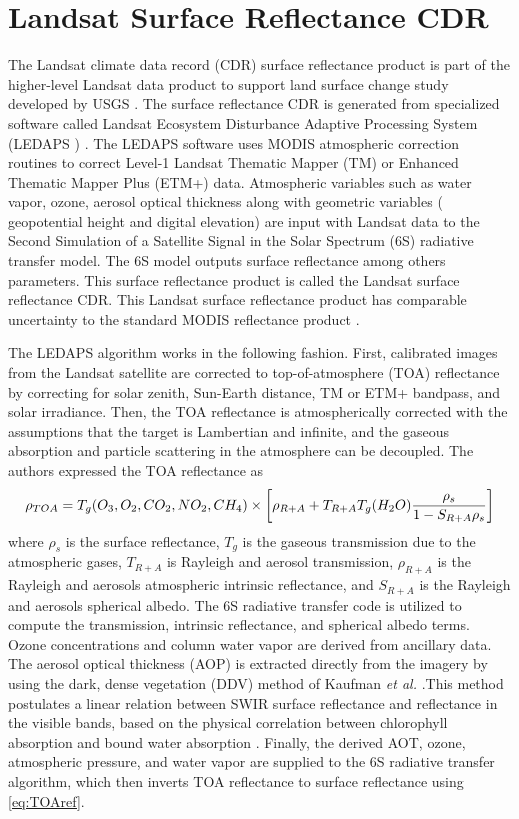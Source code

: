 \section{Landsat Surface Reflectance CDR}
\label{sec:CDR} 
The Landsat climate data record (CDR) surface reflectance product is part of the higher-level Landsat data product to support land surface change study developed by USGS \cite{LandsatCDR}. The surface reflectance CDR is generated from specialized software called Landsat Ecosystem Disturbance Adaptive Processing System (LEDAPS  ) \cite{Masek:2006}. The LEDAPS software uses MODIS atmospheric correction routines to correct Level-1 Landsat Thematic Mapper (TM) or Enhanced Thematic Mapper Plus (ETM+) data. Atmospheric variables such as water vapor, ozone, aerosol optical thickness along with geometric variables ({ geopotential height} and digital elevation) are input with Landsat data to the Second Simulation of a Satellite Signal in the Solar Spectrum (6S) radiative transfer model. The 6S model outputs surface reflectance among others parameters. This surface reflectance product is called the Landsat surface reflectance CDR. This Landsat surface reflectance product has comparable uncertainty to the standard MODIS reflectance product \cite{Masek:2006}.

The LEDAPS algorithm works in the following fashion. First, calibrated images from the Landsat satellite are corrected to { top-of-atmosphere (TOA) reflectance} by correcting for solar zenith, Sun-Earth distance, TM or ETM+ bandpass, and solar irradiance. Then, the TOA reflectance is atmospherically corrected with the assumptions that the target is Lambertian and infinite, and the gaseous absorption and particle scattering in the atmosphere can be decoupled. The authors expressed the TOA reflectance as
\begin{equation}
	\rho_{TOA}=T_g(O_3,O_2,CO_2,NO_2,CH_4)\\	
		\times \left[\rho_{R+A}+T_{R+A}T_g(H_2O)\frac{\rho_s}{1-S_{R+A}\rho_s}\right]
		\label{eq:TOAref} 
\end{equation}
where $\rho_s$ is the surface reflectance, $T_g$ is the gaseous transmission due to the atmospheric gases, $T_{R+A}$ is Rayleigh and aerosol transmission, $\rho_{R+A}$ is the Rayleigh and aerosols atmospheric intrinsic reflectance, and $S_{R+A}$ is the Rayleigh and aerosols spherical albedo. The 6S radiative transfer code is utilized to compute the transmission, intrinsic reflectance, and spherical albedo terms. Ozone concentrations and column water vapor are derived from ancillary data. The aerosol optical thickness (AOP) is extracted directly from the imagery by using the dark, dense vegetation (DDV) method of Kaufman {\it et al.} .This method postulates a linear relation between SWIR surface reflectance and reflectance in the visible bands, based on the physical correlation between chlorophyll absorption and bound water absorption . Finally, the derived AOT, ozone, atmospheric pressure, and water vapor are supplied to the 6S radiative transfer algorithm, which then inverts TOA reflectance to surface reflectance using \autoref{eq:TOAref}. 

